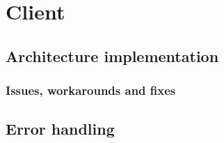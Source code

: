 \section{Client}
\label{Implementation_Client}

\subsection[Architecture]{Architecture implementation}
\label{Implementation_Client_Architecture}

\subsubsection{Issues, workarounds and fixes}
\label{Implementation_Client_Architecture_Issues}

\subsection{Error handling}
\label{Implementation_Client_Error}